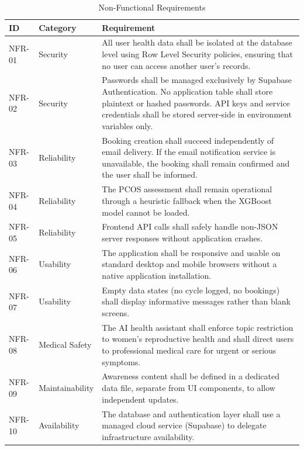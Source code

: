 \begin{table}[h!]
\centering
\caption{Non-Functional Requirements}
\label{tab:nfr}
\renewcommand{\arraystretch}{1.4}
\begin{tabular}{|p{1.2cm}|p{3cm}|p{8.5cm}|}
\hline
\rowcolor[HTML]{D9D9D9}
\textbf{ID} & \textbf{Category} & \textbf{Requirement} \\
\hline
NFR-01 & Security & All user health data shall be isolated at the database level using Row Level Security policies, ensuring that no user can access another user's records. \\
\hline
NFR-02 & Security & Passwords shall be managed exclusively by Supabase Authentication. No application table shall store plaintext or hashed passwords. API keys and service credentials shall be stored server-side in environment variables only. \\
\hline
NFR-03 & Reliability & Booking creation shall succeed independently of email delivery. If the email notification service is unavailable, the booking shall remain confirmed and the user shall be informed. \\
\hline
NFR-04 & Reliability & The PCOS assessment shall remain operational through a heuristic fallback when the XGBoost model cannot be loaded. \\
\hline
NFR-05 & Reliability & Frontend API calls shall safely handle non-JSON server responses without application crashes. \\
\hline
NFR-06 & Usability & The application shall be responsive and usable on standard desktop and mobile browsers without a native application installation. \\
\hline
NFR-07 & Usability & Empty data states (no cycle logged, no bookings) shall display informative messages rather than blank screens. \\
\hline
NFR-08 & Medical Safety & The AI health assistant shall enforce topic restriction to women's reproductive health and shall direct users to professional medical care for urgent or serious symptoms. \\
\hline
NFR-09 & Maintainability & Awareness content shall be defined in a dedicated data file, separate from UI components, to allow independent updates. \\
\hline
NFR-10 & Availability & The database and authentication layer shall use a managed cloud service (Supabase) to delegate infrastructure availability. \\
\hline
\end{tabular}
\end{table}

